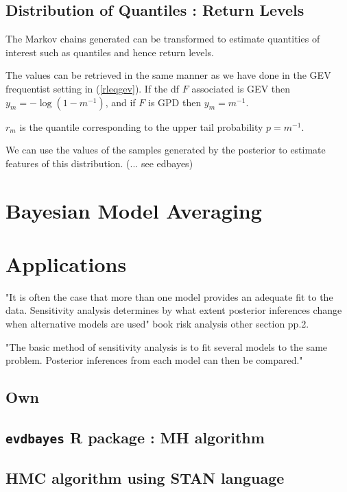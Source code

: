 \documentclass[11pt,a4paper,openany ]{book}
\begin{document}
\subsection{Distribution of Quantiles : Return Levels}

The Markov chains generated can be transformed to estimate quantities of interest such as quantiles and hence return levels.

The values can be retrieved in the same manner as we have done in the GEV frequentist setting in (\ref{rleqgev}). If the df $F$ associated is GEV then $y_m = -\log(1-m^{-1})$, and if $F$ is GPD then $y_m=m^{-1}$.

$r_m$ is the quantile corresponding to the upper tail probability $p=m^{-1}$. 

We can use the values of the samples generated by the posterior to estimate features of this distribution. (... see edbayes)
 
 

\section{Bayesian Model Averaging}


\section{Applications}

"It is often the case that more than one model provides an adequate fit to the data. Sensitivity analysis determines by what extent posterior inferences change when alternative
models are used"   book risk analysis other section pp.2.

"The basic method of sensitivity analysis is to fit several models to
the same problem. Posterior inferences from each model can then be compared."
\subsection{Own }


\subsection{\texttt{evdbayes} R package : MH algorithm}



\subsection{HMC algorithm using STAN language}
\end{document}
